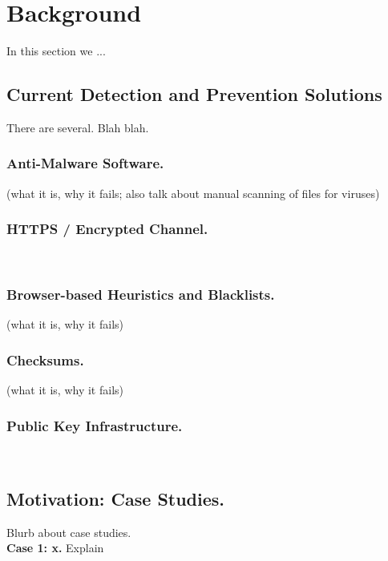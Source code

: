 \section{Background} \label{sec:background}

In this section we ...


\subsection{Current Detection and Prevention Solutions}

There are several. Blah blah.

\subsubsection{Anti-Malware Software.}    (what it is, why it fails; also talk
about manual scanning of files for viruses)

\subsubsection{HTTPS / Encrypted Channel.}   ~\cite{HTTP, HTTPS, TLS1, TLS2, DTLS}

\subsubsection{Browser-based Heuristics and Blacklists.}    (what it is, why it
fails)

\subsubsection{Checksums.}    (what it is, why it fails)

\subsubsection{Public Key Infrastructure.}   ~\cite{DANE1, DANE2, DANE3, OpenPGP1}

\subsection{Motivation: Case Studies.}

Blurb about case studies. \\

\noindent\textbf{Case 1: x.}    Explain \\

